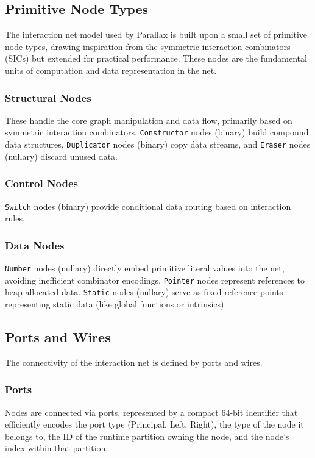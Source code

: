 \subsection{Primitive Node Types}

The interaction net model used by Parallax is built upon a small set of primitive node types, drawing inspiration from the symmetric interaction combinators (SICs) but extended for practical performance. These nodes are the fundamental units of computation and data representation in the net.

\subsubsection{Structural Nodes}
These handle the core graph manipulation and data flow, primarily based on symmetric interaction combinators. \texttt{Constructor} nodes (binary) build compound data structures, \texttt{Duplicator} nodes (binary) copy data streams, and \texttt{Eraser} nodes (nullary) discard unused data.

\subsubsection{Control Nodes}
\texttt{Switch} nodes (binary) provide conditional data routing based on interaction rules.

\subsubsection{Data Nodes}
\texttt{Number} nodes (nullary) directly embed primitive literal values into the net, avoiding inefficient combinator encodings. \texttt{Pointer} nodes represent references to heap-allocated data. \texttt{Static} nodes (nullary) serve as fixed reference points representing static data (like global functions or intrinsics).

\subsection{Ports and Wires}

The connectivity of the interaction net is defined by ports and wires.

\subsubsection{Ports}
Nodes are connected via ports, represented by a compact 64-bit identifier that efficiently encodes the port type (Principal, Left, Right), the type of the node it belongs to, the ID of the runtime partition owning the node, and the node's index within that partition.

